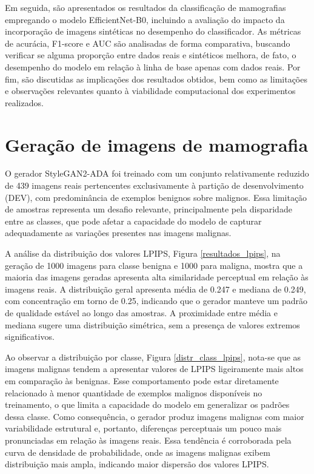 \documentclass[
	12pt,				%
	openright,			%
	oneside,			%
	a4paper,			%
	tcc,			%
	]{ABNT-DC-UEL}
\begin{document}
Em seguida, são apresentados os resultados da classificação de mamografias empregando o modelo EfficientNet-B0, incluindo a avaliação do impacto da incorporação de imagens sintéticas no desempenho do classificador. As métricas de acurácia, F1-score e AUC são analisadas de forma comparativa, buscando verificar se alguma proporção entre dados reais e sintéticos melhora, de fato, o desempenho do modelo em relação à linha de base apenas com dados reais. Por fim, são discutidas as implicações dos resultados obtidos, bem como as limitações e observações relevantes quanto à viabilidade computacional dos experimentos realizados.

\section{Geração de imagens de mamografia}

O gerador StyleGAN2-ADA foi treinado com um conjunto relativamente reduzido de 439 imagens reais pertencentes exclusivamente à partição de desenvolvimento (DEV), com predominância de exemplos benignos sobre malignos. Essa limitação de amostras representa um desafio relevante, principalmente pela disparidade entre as classes, que pode afetar a capacidade do modelo de capturar adequadamente as variações presentes nas imagens malignas.

A análise da distribuição dos valores LPIPS, Figura \ref{resultados_lpips}, na geração de 1000 imagens para classe benigna e 1000 para maligna, mostra que a maioria das imagens geradas apresenta alta similaridade perceptual em relação às imagens reais. A distribuição geral apresenta média de 0.247 e mediana de 0.249, com concentração em torno de 0.25, indicando que o gerador manteve um padrão de qualidade estável ao longo das amostras. A proximidade entre média e mediana sugere uma distribuição simétrica, sem a presença de valores extremos significativos.

Ao observar a distribuição por classe, Figura \ref{distr_class_lpips}, nota-se que as imagens malignas tendem a apresentar valores de LPIPS ligeiramente mais altos em comparação às benignas. Esse comportamento pode estar diretamente relacionado à menor quantidade de exemplos malignos disponíveis no treinamento, o que limita a capacidade do modelo em generalizar os padrões dessa classe. Como consequência, o gerador produz imagens malignas com maior variabilidade estrutural e, portanto, diferenças perceptuais um pouco mais pronunciadas em relação às imagens reais. Essa tendência é corroborada pela curva de densidade de probabilidade, onde as imagens malignas exibem distribuição mais ampla, indicando maior dispersão dos valores LPIPS.
\end{document}
